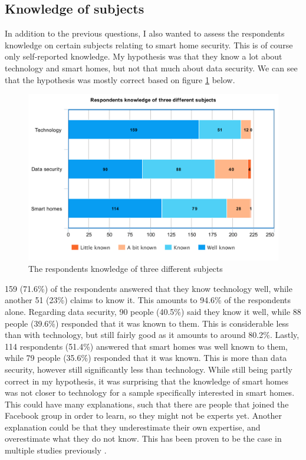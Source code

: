 \subsection{Knowledge of subjects}
In addition to the previous questions, I also wanted to assess the respondents knowledge on certain subjects relating to smart home security. This is of course only self-reported knowledge. My hypothesis was that they know a lot about technology and smart homes, but not that much about data security. We can see that the hypothesis was mostly correct based on figure \ref{fig:knowledge} below. 
\begin{figure}[!h]
    \centering
    \includegraphics[scale=0.3]{figures/diagrams/knowledge.pdf}
    \caption{The respondents knowledge of three different subjects}
    \label{fig:knowledge}
\end{figure}

159 (71.6\%) of the respondents answered that they know technology well, while another 51 (23\%) claims to know it. This amounts to 94.6\% of the respondents alone. Regarding data security, 90 people (40.5\%) said they know it well, while 88 people (39.6\%) responded that it was known to them. This is considerable less than with technology, but still fairly good as it amounts to around 80.2\%. Lastly, 114 respondents (51.4\%) answered that smart homes was well known to them, while 79 people (35.6\%) responded that it was known. This is more than data security, however still significantly less than technology. While still being partly correct in my hypothesis, it was surprising that the knowledge of smart homes was not closer to technology for a sample specifically interested in smart homes. This could have many explanations, such that there are people that joined the Facebook group in order to learn, so they might not be experts yet. Another explanation could be that they underestimate their own expertise, and overestimate what they do not know. This has been proven to be the case in multiple studies previously \cite{Ehrlinger2008} \cite{MCCORMICK1986205}. 

